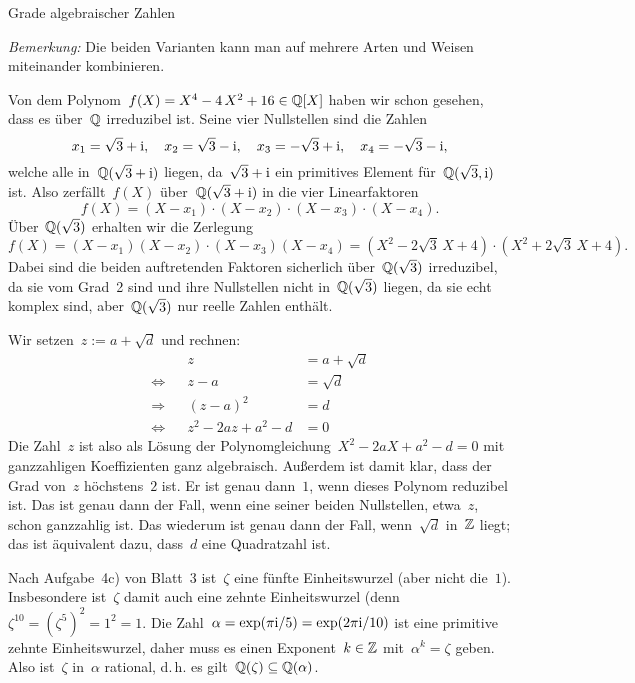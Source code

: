 \documentclass{algblatt}
\begin{document}
\begin{aufgabe}{Grade algebraischer Zahlen}
\begin{loesungE}
\emph{Bemerkung:} Die beiden Varianten kann man auf mehrere Arten und Weisen
miteinander kombinieren.

\item Von dem Polynom~$f(X) = X^4 - 4\,X^2 + 16 \in \mathbb{Q}[X]$ haben wir schon
gesehen, dass es über~$\mathbb{Q}$ irreduzibel ist. Seine vier Nullstellen sind die
Zahlen
\[ x_1 = \sqrt{3} + \mathrm{i},\quad x_2 = \sqrt{3} - \mathrm{i},\quad x_3 = -\sqrt{3} +
\mathrm{i},\quad x_4 = -\sqrt{3} - \mathrm{i}, \]
welche alle in~$\mathbb{Q}(\sqrt{3} + \mathrm{i})$ liegen, da~$\sqrt{3} + \mathrm{i}$ ein primitives
Element für~$\mathbb{Q}(\sqrt{3},\mathrm{i})$ ist. Also zerfällt~$f(X)$
über~$\mathbb{Q}(\sqrt{3}+\mathrm{i})$ in die vier Linearfaktoren
\[ f(X) = (X-x_1) \cdot (X-x_2) \cdot (X-x_3) \cdot (X-x_4). \]
Über~$\mathbb{Q}(\sqrt{3})$ erhalten wir die Zerlegung
\[ f(X) = (X-x_1) (X-x_2) \cdot (X-x_3) (X-x_4) =
  (X^2 - 2\sqrt{3}\,X + 4) \cdot (X^2 + 2\sqrt{3}\,X + 4). \]
Dabei sind die beiden auftretenden Faktoren sicherlich über~$\mathbb{Q}(\sqrt{3})$
irreduzibel, da sie vom Grad~2 sind und ihre Nullstellen nicht
in~$\mathbb{Q}(\sqrt{3})$ liegen, da sie echt komplex sind,
aber~$\mathbb{Q}(\sqrt{3})$ nur reelle Zahlen enthält.

\item Wir setzen~$z := a + \sqrt{d}$ und rechnen:
\begin{align*}
  && z &= a + \sqrt{d} \\
  \Longleftrightarrow&& z - a &= \sqrt{d} \\
  \Longrightarrow&& (z-a)^2 &= d \\
  \Longleftrightarrow && z^2 - 2az + a^2-d &= 0
\end{align*}
Die Zahl~$z$ ist also als Lösung der Polynomgleichung~$X^2 - 2aX + a^2-d = 0$
mit ganzzahligen Koeffizienten ganz algebraisch. Außerdem ist damit klar, dass
der Grad von~$z$ höchstens~$2$ ist. Er ist genau dann~$1$, wenn dieses Polynom
reduzibel ist. Das ist genau dann der Fall, wenn eine seiner beiden
Nullstellen, etwa~$z$, schon ganzzahlig ist. Das wiederum ist genau dann der
Fall, wenn~$\sqrt{d}$ in~$\mathbb{Z}$ liegt; das ist äquivalent dazu, dass~$d$ eine
Quadratzahl ist.

\item Nach Aufgabe~4c) von Blatt~3 ist~$\zeta$ eine fünfte Einheitswurzel (aber
nicht die~$1$). Insbesondere ist~$\zeta$ damit auch eine zehnte Einheitswurzel
(denn~$\zeta^{10}= (\zeta^5)^2 = 1^2 = 1$. Die Zahl~$\alpha = \exp(\pi\mathrm{i}/5) =
\exp(2\pi\mathrm{i}/10)$ ist eine primitive zehnte Einheitswurzel, daher muss es einen
Exponent~$k \in \mathbb{Z}$ mit~$\alpha^k = \zeta$ geben. Also ist~$\zeta$ in~$\alpha$
rational, d.\,h. es gilt~$\mathbb{Q}(\zeta) \subseteq \mathbb{Q}(\alpha)$.


\end{loesungE}
\end{aufgabe}
\end{document}
